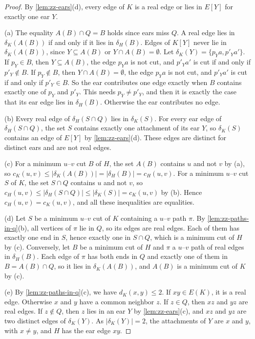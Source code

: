\begin{proof}
By \cref{lem:zz-ears}(d), every edge of $K$ is a real edge or lies in $E[Y]$ for exactly one ear $Y$.

(a) The equality $A(B) \cap Q = B$ holds since ears miss $Q$.
A real edge lies in $\delta_K(A(B))$ if and only if it lies in $\delta_H(B)$.
Edges of $K[Y]$ never lie in $\delta_K(A(B))$, since $Y \subseteq A(B)$ or $Y \cap A(B) = \emptyset$.
Let $\delta_K(Y) = \{p_Y a, p'_Y a'\}$.
If $p_Y \in B$, then $Y \subseteq A(B)$, the edge $p_Y a$ is not cut, and $p'_Y a'$ is cut if and only if $p'_Y \notin B$.
If $p_Y \notin B$, then $Y \cap A(B) = \emptyset$, the edge $p_Y a$ is not cut, and $p'_Y a'$ is cut if and only if $p'_Y \in B$.
So the ear contributes one edge exactly when $B$ contains exactly one of $p_Y$ and $p'_Y$.
This needs $p_Y \neq p'_Y$, and then it is exactly the case that its ear edge lies in $\delta_H(B)$.
Otherwise the ear contributes no edge.

(b) Every real edge of $\delta_H(S \cap Q)$ lies in $\delta_K(S)$.
For every ear edge of $\delta_H(S \cap Q)$, the set $S$ contains exactly one attachment of its ear $Y$, so $\delta_K(S)$ contains an edge of $E[Y]$ by \cref{lem:zz-ears}(d).
These edges are distinct for distinct ears and are not real edges.

(c) For a minimum $u$--$v$ cut $B$ of $H$, the set $A(B)$ contains $u$ and not $v$ by (a), so $c_K(u, v) \leq |\delta_K(A(B))| = |\delta_H(B)| = c_H(u, v)$.
For a minimum $u$--$v$ cut $S$ of $K$, the set $S \cap Q$ contains $u$ and not $v$, so $c_H(u, v) \leq |\delta_H(S \cap Q)| \leq |\delta_K(S)| = c_K(u, v)$ by (b).
Hence $c_H(u, v) = c_K(u, v)$, and all these inequalities are equalities.

(d) Let $S$ be a minimum $u$--$v$ cut of $K$ containing a $u$--$v$ path $\pi$.
By \cref{lem:zz-paths-in-q}(b), all vertices of $\pi$ lie in $Q$, so its edges are real edges.
Each of them has exactly one end in $S$, hence exactly one in $S \cap Q$, which is a minimum cut of $H$ by (c).
Conversely, let $B$ be a minimum cut of $H$ and $\pi$ a $u$--$v$ path of real edges in $\delta_H(B)$.
Each edge of $\pi$ has both ends in $Q$ and exactly one of them in $B = A(B) \cap Q$, so it lies in $\delta_K(A(B))$, and $A(B)$ is a minimum cut of $K$ by (c).

(e) By \cref{lem:zz-paths-in-q}(c), we have $d_K(x, y) \leq 2$.
If $xy \in E(K)$, it is a real edge.
Otherwise $x$ and $y$ have a common neighbor $z$.
If $z \in Q$, then $xz$ and $yz$ are real edges.
If $z \notin Q$, then $z$ lies in an ear $Y$ by \cref{lem:zz-ears}(c), and $xz$ and $yz$ are two distinct edges of $\delta_K(Y)$.
As $|\delta_K(Y)| = 2$, the attachments of $Y$ are $x$ and $y$, with $x \neq y$, and $H$ has the ear edge $xy$.
\end{proof}


